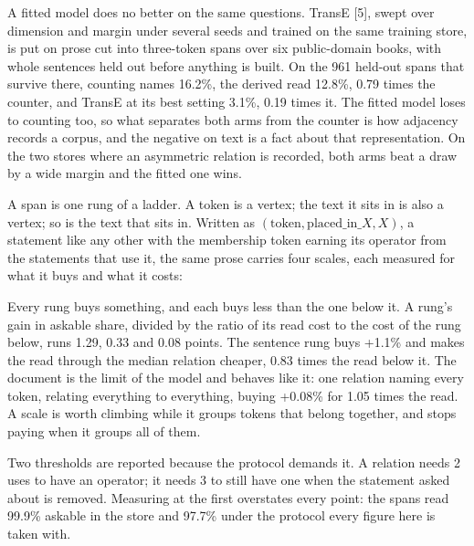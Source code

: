 \documentclass[10pt,letterpaper,twocolumn]{article}
\begin{document}
A fitted model does no better on the same questions. TransE {[}5{]}, swept over dimension and margin
under several seeds and trained on the same training store, is put on prose cut into three-token
spans over six public-domain books, with whole sentences held out before anything is built. On the
961 held-out spans that survive there, counting names 16.2\%, the derived read 12.8\%, 0.79 times the
counter, and TransE at its best setting 3.1\%, 0.19 times it. The fitted model loses to counting too,
so what separates both arms from the counter is how adjacency records a corpus, and the negative on
text is a fact about that representation. On the two stores where an asymmetric relation is
recorded, both arms beat a draw by a wide margin and the fitted one wins.

A span is one rung of a ladder. A token is a vertex; the text it sits in is also a vertex; so is the
text that sits in. Written as \((\text{token}, \text{placed\_in\_}X, X)\), a statement like any other
with the membership token earning its operator from the statements that use it, the same prose
carries four scales, each measured for what it buys and what it costs:


Every rung buys something, and each buys less than the one below it. A rung's gain in askable share,
divided by the ratio of its read cost to the cost of the rung below, runs 1.29, 0.33 and 0.08 points.
The sentence rung buys +1.1\% and makes the read through the median relation cheaper, 0.83 times the
read below it. The document is the limit of the model and behaves like it: one relation naming every
token, relating everything to everything, buying +0.08\% for 1.05 times the read. A scale is worth
climbing while it groups tokens that belong together, and stops paying when it groups all of them.

Two thresholds are reported because the protocol demands it. A relation needs 2 uses to have an
operator; it needs 3 to still have one when the statement asked about is removed. Measuring at the
first overstates every point: the spans read 99.9\% askable in the store and 97.7\% under the protocol
every figure here is taken with.
\end{document}
